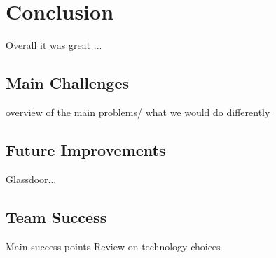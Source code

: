\section{Conclusion}
	Overall it was great ...
	\subsection{Main Challenges}
		overview of the main problems/ what we would do differently
	\subsection{Future Improvements}
		Glassdoor...
	\subsection{Team Success}
		Main success points
		Review on technology choices
